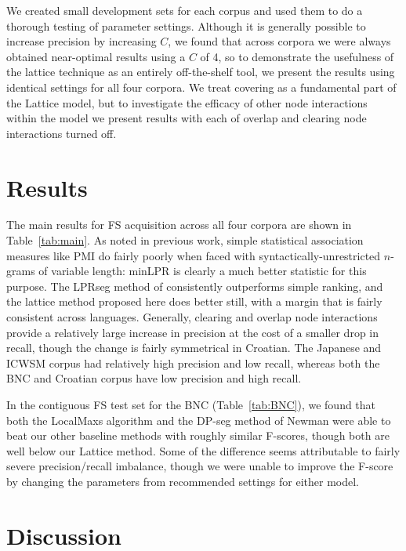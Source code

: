 \documentclass[11pt,letterpaper]{article}
\newcommand{\tabref}[2][]{Table#1~\ref{#2}\xspace}
\begin{document}
We created small development sets for each corpus and used them to do a thorough testing of parameter settings. Although it is generally possible to increase precision by increasing $C$, we found that across corpora we were always obtained near-optimal results using a $C$ of 4, so to demonstrate the usefulness of the lattice technique as an entirely off-the-shelf tool, we present the results using identical settings for all four corpora. We treat covering as a fundamental part of the Lattice model, but to investigate the efficacy of other node interactions within the model we present results with each of overlap and clearing node interactions turned off.
		

\section{Results}

The main results for FS acquisition across all four corpora are shown in \tabref{tab:main}. As noted in previous work, simple statistical association measures like PMI do fairly poorly when faced with syntactically-unrestricted $n$-grams of variable length: minLPR is clearly a much better statistic for this purpose. The LPRseg method of  consistently outperforms simple ranking, and the lattice method proposed here does better still, with a margin that is fairly consistent across languages. Generally, clearing and overlap node interactions provide a relatively large increase in precision at the cost of a smaller drop in recall, though the change is fairly symmetrical in Croatian. The Japanese and ICWSM corpus had relatively high precision and low recall, whereas both the BNC and Croatian corpus have low precision and high recall.

In the contiguous FS test set for the BNC (\tabref{tab:BNC}), we found that both the LocalMaxs algorithm and the DP-seg method of Newman \cite{Newman12} were able to beat our other baseline methods with roughly similar F-scores, though both are well below our Lattice method. Some of the difference seems attributable to fairly severe precision/recall imbalance, though we were unable to improve the F-score by changing the parameters from recommended settings for either model.


\section{Discussion} \label{sec:discussion}
\end{document}
